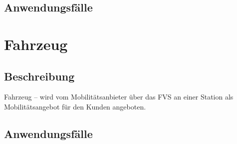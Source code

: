 \subsection{Anwendungsfälle}

\section{Fahrzeug}

\subsection{Beschreibung}
Fahrzeug – wird vom Mobilitätsanbieter über das FVS an einer Station als Mobilitätsangebot für den Kunden angeboten.

\subsection{Anwendungsfälle}

